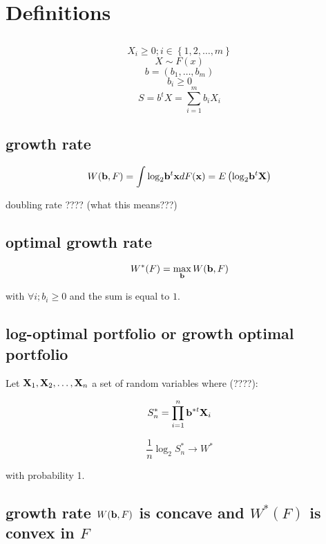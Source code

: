 \section{Definitions}




\subsection{}

\[{X_i} \ge 0;i \in \left\{ {1,2, \ldots ,m} \right\}\]
\[X\sim F(x)\]
\[b = ({b_1}, \ldots ,{b_m})\]
\[{b_i} \ge 0\]
\[S = {b^t}X = \sum\limits_{i = 1}^m {{b_i}{X_i}}\] 

\subsection{growth rate}
\[W({\bf{b}},F) = \int {{{\log }_2}{{\bf{b}}^t}{\bf{x}}dF({\bf{x}}) = E\left( {{{\log }_2}{{\bf{b}}^t}{\bf{X}}} \right)} \]

doubling rate ???? (what this means???)

\subsection{optimal growth rate}

\[{W^*}(F) = \mathop {\max }\limits_{\bf{b}} W({\bf{b}},F)\]

with $\forall i; b_i \ge 0$ and the sum is equal to $1$.



\subsection{log-optimal portfolio or growth optimal portfolio}

Let ${{\bf{X}}_1},{{\bf{X}}_2}, \ldots ,{{\bf{X}}_n}$ a set of random variables where (????):

\[S_n^* = \prod\limits_{i = 1}^n {{{\bf{b}}^{*t}}{{\bf{X}}_i}} \]

\[\frac{1}{n}{\log _2}S_n^* \to {W^*}\]

with probability 1.


\subsection{growth rate $W({\bf{b}},F)$ is concave and ${W^*}(F)$ is convex in $F$}


